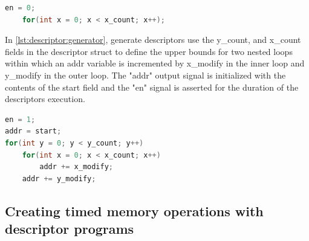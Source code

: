 \begin{lstlisting}[language=C, caption=WAIT Descriptor, label={lst:descriptor:wait}]
    en = 0;
    for(int x = 0; x < x_count; x++);
\end{lstlisting}

In \autoref{lst:descriptor:generator}, generate descriptors use the y\_count,
and x\_count fields in the descriptor struct to define the upper bounds for two
nested loops within which an addr variable is incremented by x\_modify in the
inner loop and y\_modify in the outer loop. The "addr" output signal is
initialized with the contents of the start field and the "en" signal is asserted
for the duration of the descriptors execution.

\begin{lstlisting}[language=C, caption=GENERATE Descriptor, label={lst:descriptor:generator}]
en = 1;
addr = start;
for(int y = 0; y < y_count; y++)
    for(int x = 0; x < x_count; x++)
        addr += x_modify;
    addr += y_modify;
\end{lstlisting}



\subsection{Creating timed memory operations with descriptor programs}
\label{chap:data_orchestration:sams:memory_transactions}

